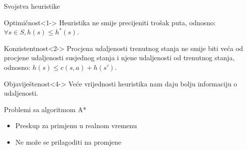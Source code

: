 \documentclass[utf8]{beamer}
\begin{document}
\begin{frame}{Svojstva heuristike}
    \begin{block}{Optimičnost}<1->
        Heuristika ne smije precijeniti trošak puta, odnosno:
        \(\forall s \in S, h(s) \leq h^*(s)\).
    \end{block}
  
    \begin{block}{Konzistentnost}<2->
        Procjena udaljenosti trenutnog stanja ne smije biti veća od procjene udaljenosti susjednog stanja i njene udaljenosti od trenutnog stanja, odnosno:
        \(h(s) \leq c(s, a) + h(s')\).
    \end{block}


    \begin{block}{Objaviještenost}<4->
        Veće vrijednosti heuristika nam daju bolju informaciju o udaljenosti.
    \end{block}
\end{frame}

\begin{frame}{Problemi sa algoritmom A*}
    \begin{itemize}
        \item Preskup za primjenu u realnom vremenu
        \item Ne može se prilagoditi na promjene
    \end{itemize}
\end{frame}
\end{document}
